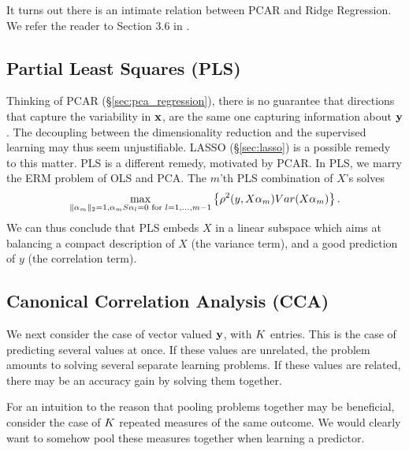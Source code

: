 \begin{remark}
It turns out there is an intimate relation between PCAR and Ridge Regression.
We refer the reader to Section 3.6 in \cite{hastie_elements_2003}.
\end{remark}





\subsection{Partial Least Squares (PLS) }
\label{sec:pls}

Thinking of PCAR (\S\ref{sec:pca_regression}), there is no guarantee that directions that capture the variability in $\mathbf{x}$, are the same one capturing information about $\mathbf{y}$.
The decoupling between the dimensionality reduction and the supervised learning may thus seem unjustifiable. 
LASSO (\S\ref{sec:lasso}) is a possible remedy to this matter. 
PLS is a different remedy, motivated by PCAR.
In PLS, we marry the ERM problem of OLS and PCA.
The $m$'th PLS combination of $X$'s solves \citep[Eq.3.64]{hastie_elements_2003}
\begin{align}
\label{eq:pls}
	\max_{\Vert \alpha_m \Vert_2=1, \alpha_m S \alpha_l=0 \text{ for } l=1,\dots,m-1 } \left\{ \rho^2(y, X \alpha_m) Var(X \alpha_m)  \right\}.
\end{align}
We can thus conclude that PLS embeds $X$ in a linear subspace which aims at balancing a compact description of $X$ (the variance term), and a good prediction of $y$ (the correlation term).





\subsection{Canonical Correlation Analysis (CCA)}
\label{sec:cca}

We next consider the case of vector valued $\mathbf{y}$, with $K$ entries. 
This is the case of predicting several values at once.
If these values are unrelated, the problem amounts to solving several separate learning problems.
If these values are related, there may be an accuracy gain by solving them together.

For an intuition to the reason that pooling problems together may be beneficial, consider the case of $K$ repeated measures of the same outcome. We would clearly want to somehow pool these measures together when learning a predictor.

